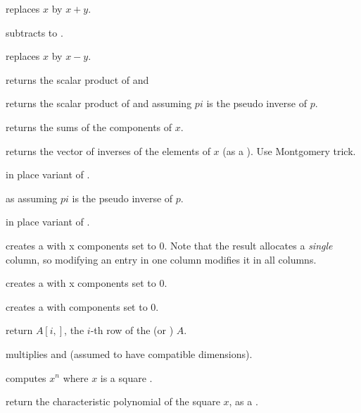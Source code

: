  replaces
$x$ by $x+y$.

 subtracts  to .

 replaces
$x$ by $x-y$.

 returns the scalar product
of  and 

 returns the scalar product
of  and  assuming $pi$ is the pseudo inverse of $p$.

 returns the sums of the components of $x$.

 returns the vector of inverses of the elements
of $x$ (as a ). Use Montgomery trick.

 in place variant of .

 as 
assuming $pi$ is the pseudo inverse of $p$.

 in place variant of
.

 creates a  with  x 
components set to $0$. Note that the result allocates a
\emph{single} column, so modifying an entry in one column modifies it in
all columns.

 creates a  with  x
 components set to $0$.

 creates a  with  components set to
$0$.

 return $A[i,]$, the $i$-th row of the
 (or ) $A$.

 multiplies   and 
(assumed to have compatible dimensions).

 computes $x^n$ where $x$ is a
square .

 return the characteristic polynomial of
the square  $x$, as a .




